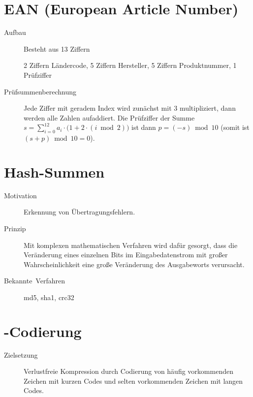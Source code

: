 \section{EAN (\foreignlanguage{english}{European Article Number})}
\begin{description}
  \item [{Aufbau}]
	Besteht aus 13 Ziffern

	2 Ziffern Ländercode, 5 Ziffern Hersteller, 5 Ziffern Produktnummer, 1 Prüfziffer

  \item [{Prüfsummenberechnung}]
	Jede Ziffer mit geradem Index wird zunächst mit 3 multipliziert, dann werden alle Zahlen aufaddiert.
	Die Prüfziffer der Summe $s=\sum_{i=0}^{12} a_i\cdot \bigl( 1+2\cdot(i\bmod 2) \bigr)$ ist dann $p=(-s)\bmod 10$ (somit ist $(s+p)\bmod 10=0$).
\end{description}

\section{Hash-Summen}
\begin{description}
  \item [{Motivation}] 
	Erkennung von Übertragungsfehlern.
  \item [{Prinzip}] 
	Mit komplexen mathematischen Verfahren wird dafür gesorgt, dass die Veränderung eines einzelnen Bits im Eingabedatenstrom mit großer Wahrscheinlichkeit eine große Veränderung des Ausgabeworts verursacht.
  \item [{Bekannte~Verfahren}]
	\gls{md5}, \gls{sha1}, \gls{crc32}
\end{description}

\section{\protect{}-Codierung}
\begin{description}
  \item [{Zielsetzung}] 
	Verlustfreie Kompression durch Codierung von häufig vorkommenden Zeichen mit kurzen Codes und selten vorkommenden Zeichen mit langen Codes.
\end{description}

